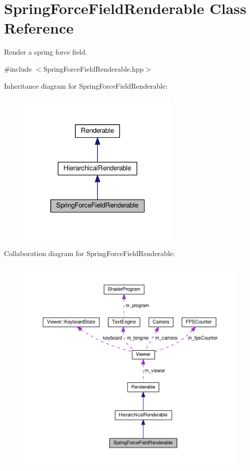 \hypertarget{classSpringForceFieldRenderable}{\section{Spring\+Force\+Field\+Renderable Class Reference}
\label{classSpringForceFieldRenderable}
}


Render a spring force field.  




{\ttfamily \#include $<$Spring\+Force\+Field\+Renderable.\+hpp$>$}



Inheritance diagram for Spring\+Force\+Field\+Renderable\+:\nopagebreak
\begin{figure}[H]
\begin{center}
\leavevmode
\includegraphics[width=220pt]{classSpringForceFieldRenderable__inherit__graph}
\end{center}
\end{figure}


Collaboration diagram for Spring\+Force\+Field\+Renderable\+:\nopagebreak
\begin{figure}[H]
\begin{center}
\leavevmode
\includegraphics[width=350pt]{classSpringForceFieldRenderable__coll__graph}
\end{center}
\end{figure}
